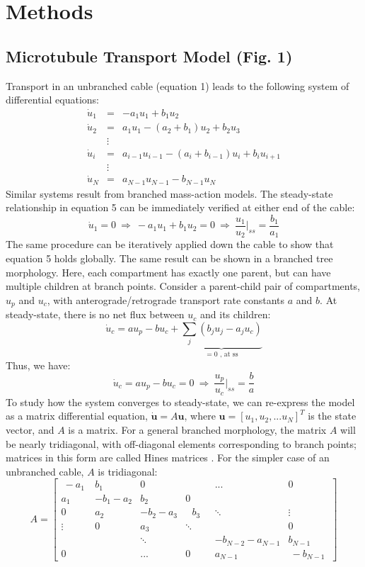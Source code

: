 \documentclass[10pt]{wlpeerj}
\begin{document}
\section*{Methods}

\subsection*{Microtubule Transport Model (Fig. 1)}
Transport in an unbranched cable (equation 1) leads to the following system of differential equations:
$$
\begin{array}{lcl}
\dot{u}_1 & = & -a_1 u_1 + b_1 u_2 \\
\dot{u}_2 & = & a_1 u_1 - (a_2+b_1) u_2 + b_2 u_3 \\
~ & \vdots & ~ \\
\dot{u}_i & = & a_{i-1} u_{i-1} - (a_i+b_{i-1}) u_i + b_i u_{i+1} \\
~ & \vdots & ~ \\
\dot{u}_N & = & a_{N-1} u_{N-1} - b_{N-1} u_N 
\end{array}
$$
Similar systems result from branched mass-action models. The steady-state relationship in equation 5 can be immediately verified at either end of the cable:
$$
\dot{u}_1 = 0 ~\Rightarrow~ -a_{1} u_{1} + b_{1} u_2 = 0 ~\Rightarrow~ \frac{u_1}{u_2} \Bigg |_{ss} = \frac{b_1}{a_1}
$$
The same procedure can be iteratively applied down the cable to show that equation 5 holds globally. The same result can be shown in a branched tree morphology. Here, each compartment has exactly one parent, but can have multiple children at branch points. Consider a parent-child pair of compartments, $u_p$ and $u_c$, with anterograde/retrograde transport rate constants $a$ and $b$. At steady-state, there is no net flux between $u_c$ and its children:
$$
\dot{u}_c = a u_p - b u_c + \underbrace{\sum_j (b_j u_j - a_j u_c)}_{= 0 \text{ , at ss}}
$$
Thus, we have:
$$
\dot{u}_c = a u_p - b u_c = 0 ~\Rightarrow~ \frac{u_p}{u_c} \Bigg |_{ss} = \frac{b}{a}
$$
To study how the system converges to steady-state, we can re-express the model as a matrix differential equation, $\mathbf{\dot{u}} = A \mathbf{u}$, where $\mathbf{u} = \left[ u_1, u_2, ... u_N \right]^T$ is the state vector, and $A$ is a matrix. For a general branched morphology, the matrix $A$ will be nearly tridiagonal, with off-diagonal elements corresponding to branch points; matrices in this form are called Hines matrices \citep{Hines_1984}. For the simpler case of an unbranched cable, $A$ is tridiagonal:
$$
A = 
 \begin{bmatrix}
  ~-a_1~  & b_1      & 0         &         & ...              & 0        \\
   a_1    & -b_1-a_2 & b_2       &  0      &                  &          \\
   0      &  a_2     & -b_2-a_3  & ~~~ b_3~~~  & \ddots     & \vdots   \\
   \vdots &  0       & a_3       & \ddots  &                  & 0        \\
          &          & \ddots    &         & -b_{N-2}-a_{N-1} & b_{N-1}  \\
   0      &          & ...       &  0      & a_{N-1}          & ~-b_{N-1}~
 \end{bmatrix}
$$
\end{document}
